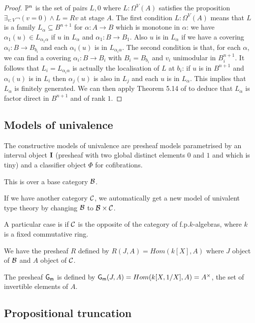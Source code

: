 \begin{proof}
  $\mathbb{P}^n$ is the set of pairs $L,0$ where $L:\Omega^V(A)$ satisfies the proposition $\exists_{v:V}\neg (v = 0)\wedge L = Rv$ at stage
  $A$. The first condition $L:\Omega^V(A)$ means that $L$ is a family $L_{\alpha}\subseteq B^{n+1}$ for $\alpha:A\rightarrow B$ which is
  monotone in $\alpha$: we have $\alpha_1(u)\in L_{\alpha_1\alpha}$ if $u$ in $L_{\alpha}$ and $\alpha_1:B\rightarrow B_1$.
  Also $u$ is in $L_{\alpha}$ if we have a covering $\alpha_i:B\rightarrow B_{b_i}$ and each $\alpha_i(u)$ is in $L_{\alpha_i\alpha}$.
  The second condition is that, for each $\alpha$, we can find a covering $\alpha_i:B\rightarrow B_i$ with $B_i = B_{b_i}$
  and $v_i$ unimodular in $B_i^{n+1}$. It follows that $L_i = L_{\alpha_i\alpha}$ is actually the localisation of $L$ at $b_i$: if $u$
  is in $B^{n+1}$ and $\alpha_i(u)$ is in $L_i$ then $\alpha_j(u)$ is also in $L_j$ and each $u$ is in $L_{\alpha}$.
  This implies \cite{lombardi-quitte} that $L_{\alpha}$ is finitely generated. We can then apply Theorem 5.14 of
  \cite{lombardi-quitte} to deduce that $L_{\alpha}$ is factor direct in $B^{n+1}$ and of rank $1$.
\end{proof}




\subsection{Models of univalence}

The constructive models of univalence are presheaf models parametrised by an interval object $\mathbf{I}$
(presheaf with two global distinct elements $0$ and $1$ and which is tiny) and a classifier object
$\Phi$ for cofibrations.

 This is over a base category $\mathcal{B}$.
 
 If we have another category $\mathcal{C}$, we automatically get a new model of univalent type theory by
 changing $\mathcal{B}$ to $\mathcal{B}\times\mathcal{C}$.

 A particular case is if $\mathcal{C}$ is the opposite of the category of f.p.\@ $k$-algebras, where $k$ is a
 fixed commutative ring.

 We have the presheaf $R$ defined by $R(J,A) = Hom(k[X],A)$ where $J$ object of $\mathcal{B}$ and $A$ object of $\mathcal{C}$.

  The presheaf $\mathsf{G_m}$ is defined by $\mathsf{G_m}(J,A) = Hom(k[X,1/X],A) = A^{\times}$, the set of invertible elements of $A$.

\subsection{Propositional truncation}

